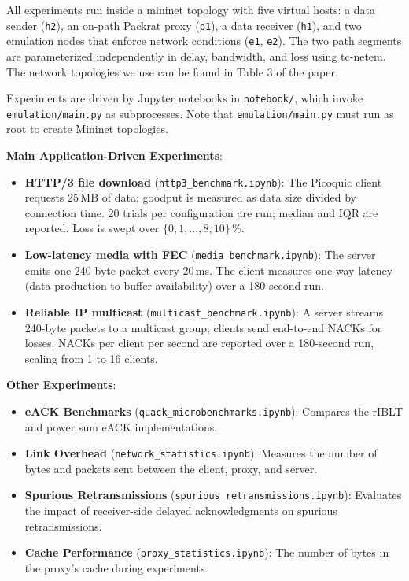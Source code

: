 \documentclass[sigplan,review]{acmart}
\begin{document}
All experiments run inside a mininet topology with five virtual hosts:
a data sender (\texttt{h2}), an on-path Packrat proxy (\texttt{p1}),
a data receiver (\texttt{h1}), and two emulation nodes that enforce network conditions (\texttt{e1},
\texttt{e2}).
The two path segments are parameterized independently in
delay, bandwidth, and loss using tc-netem.
The network topologies we use can be found in Table 3 of the paper.

Experiments are driven by Jupyter notebooks in \texttt{notebook/},
which invoke \texttt{emulation/main.py} as subprocesses.
Note that \texttt{emulation/main.py} must run as root to create Mininet topologies.

\textbf{Main Application-Driven Experiments}:

\begin{itemize}
  \item \textbf{HTTP/3 file download} (\texttt{http3\_benchmark.ipynb}):
    The Picoquic client requests 25\,MB of data; goodput is measured as
    data size divided by connection time. 20 trials per configuration are
    run; median and IQR are reported. Loss is swept over
    $\{0,1,\ldots,8,10\}$\,\%.
  \item \textbf{Low-latency media with FEC}
    (\texttt{media\_benchmark.ipynb}): The server emits one 240-byte
    packet every 20\,ms. The client measures one-way latency (data
    production to buffer availability) over a 180-second run.
  \item \textbf{Reliable IP multicast}
    (\texttt{multicast\_benchmark.ipynb}): A server streams 240-byte
    packets to a multicast group; clients send end-to-end NACKs for
    losses. NACKs per client per second are reported over a 180-second
    run, scaling from 1 to 16 clients.
\end{itemize}

\textbf{Other Experiments}:

\begin{itemize}
    \item \textbf{eACK Benchmarks} (\texttt{quack\_microbenchmarks.ipynb}): Compares the rIBLT and power sum eACK implementations.
    \item \textbf{Link Overhead} (\texttt{network\_statistics.ipynb}): Measures the number of bytes and packets sent between the client, proxy, and server.
    \item \textbf{Spurious Retransmissions} (\texttt{spurious\_retransmissions.ipynb}): Evaluates the impact of receiver-side delayed acknowledgments on spurious retransmissions.
    \item \textbf{Cache Performance} (\texttt{proxy\_statistics.ipynb}): The number of bytes in the proxy's cache during experiments.
\end{itemize}
\end{document}
